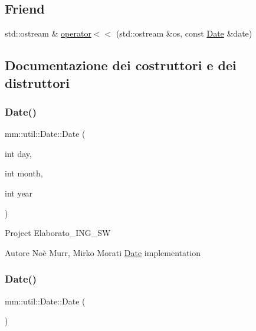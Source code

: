 \subsection*{Friend}
\begin{DoxyCompactItemize}
\item 
std\+::ostream \& \mbox{\hyperlink{structmm_1_1util_1_1_date_a1862604492a841a6b98e1a3061d95b96}{operator$<$$<$}} (std\+::ostream \&os, const \mbox{\hyperlink{structmm_1_1util_1_1_date}{Date}} \&date)
\end{DoxyCompactItemize}


\subsection{Documentazione dei costruttori e dei distruttori}
\mbox{\label{structmm_1_1util_1_1_date_afe2513fbf246f7f3e61e7d1a06d0e6d0}} 
\subsubsection{\texorpdfstring{Date()}{Date()}\hspace{0.1cm}{\footnotesize\ttfamily [1/3]}}
{\footnotesize\ttfamily mm\+::util\+::\+Date\+::\+Date (\begin{DoxyParamCaption}\item[{int}]{day,  }\item[{int}]{month,  }\item[{int}]{year }\end{DoxyParamCaption})}

Project Elaborato\+\_\+\+I\+N\+G\+\_\+\+SW \begin{DoxyAuthor}{Autore}
Noè Murr, Mirko Morati \mbox{\hyperlink{structmm_1_1util_1_1_date}{Date}} implementation 
\end{DoxyAuthor}
\mbox{\label{structmm_1_1util_1_1_date_a9aaf2c2d5171e081541831c4a756232e}} 
\subsubsection{\texorpdfstring{Date()}{Date()}\hspace{0.1cm}{\footnotesize\ttfamily [2/3]}}
{\footnotesize\ttfamily mm\+::util\+::\+Date\+::\+Date (\begin{DoxyParamCaption}{ }\end{DoxyParamCaption})}

